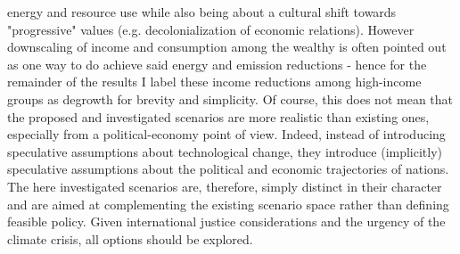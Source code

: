 \documentclass{article}
\begin{document}
energy and resource use while also being about a cultural shift towards "progressive" values (e.g. decolonialization of economic relations). However downscaling of income and consumption among the wealthy is often pointed out as one way to do achieve said energy and emission reductions - hence for the remainder of the results I label these income reductions among high-income groups as degrowth for brevity and simplicity.
Of course, this does not mean that the proposed and investigated scenarios are more realistic than existing ones, especially from a political-economy point of view. Indeed, instead of introducing speculative assumptions about technological change, they introduce (implicitly) speculative assumptions about the political and economic trajectories of nations. The here investigated scenarios are, therefore, simply distinct in their character and are aimed at complementing the existing scenario space rather than defining feasible policy. Given international justice considerations and the urgency of the climate crisis, all options should be explored.
\end{document}
